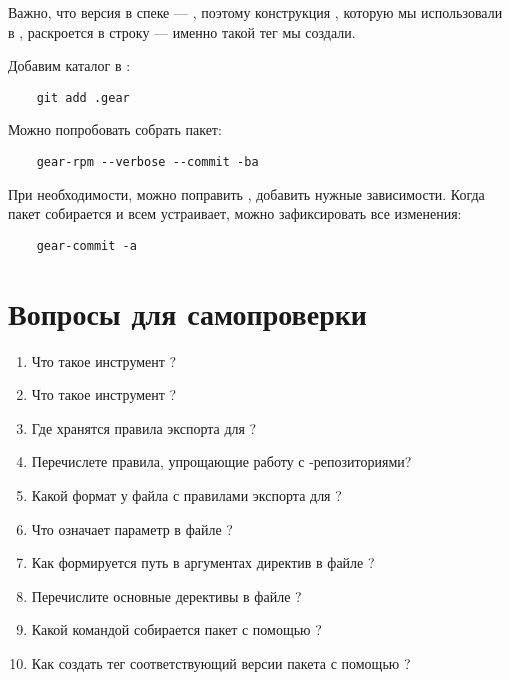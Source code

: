Важно, что версия в спеке --- , поэтому конструкция , 
которую мы использовали в , раскроется в строку  --- 
именно такой тег  мы создали. 

Добавим каталог  в :
\begin{verbatim}
	git add .gear
\end{verbatim} 

Можно попробовать собрать пакет: 
\begin{verbatim}
	gear-rpm --verbose --commit -ba
\end{verbatim}

При необходимости, можно поправить , добавить нужные зависимости. 
Когда пакет собирается и всем устраивает, можно зафиксировать все изменения: 
\begin{verbatim}
	gear-commit -a
\end{verbatim}

\section{Вопросы для самопроверки}

\begin{enumerate}
	\item Что такое инструмент ?
	\item Что такое инструмент ?
	\item Где хранятся правила экспорта для ?
	\item Перечислете правила, упрощающие работу с -репозиториями?
	\item Какой формат у файла с правилами экспорта для ?
	\item Что означает параметр  в файле ?
	\item Как формируется путь в аргументах директив в файле ?
        \item Перечислите основные дерективы в файле ?
	\item Какой командой собирается пакет с помощью ?
        \item Как создать тег соответствующий версии пакета с помощью ?
\end{enumerate}
